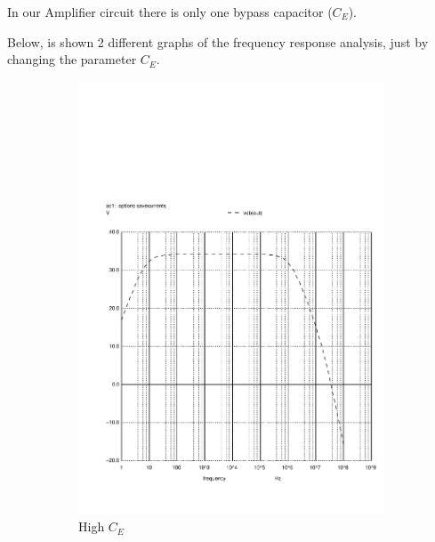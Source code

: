 In our Amplifier circuit there is only one bypass capacitor ($C_E$).\par 
Below, is shown 2 different graphs of the frequency response analysis, just by changing the parameter $C_E$.

\begin{figure}[H] 
\centering
\begin{subfigure}{0.3\textwidth}
\includegraphics[width=\textwidth]{c2high.pdf}
\caption{High $C_E$}
\label{highce}
\end{subfigure}
\begin{subfigure}{0.3\textwidth}

\end{subfigure}
\end{figure}

